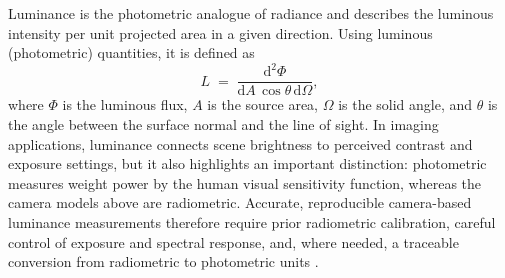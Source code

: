


\noindent
Luminance is the photometric analogue of radiance and describes the luminous intensity per unit projected area in a given direction. Using luminous (photometric) quantities, it is defined as
\begin{equation}
L \;=\; \frac{\mathrm{d}^{2}\Phi}{\mathrm{d}A\,\cos\theta\,\mathrm{d}\Omega},
\end{equation}
where \(\Phi\) is the luminous flux, \(A\) is the source area, \(\Omega\) is the solid angle, and \(\theta\) is the angle between the surface normal and the line of sight. In imaging applications, luminance connects scene brightness to perceived contrast and exposure settings, but it also highlights an important distinction: photometric measures weight power by the human visual sensitivity function, whereas the camera models above are radiometric. Accurate, reproducible camera-based luminance measurements therefore require prior radiometric calibration, careful control of exposure and spectral response, and, where needed, a traceable conversion from radiometric to photometric units \cite{Wuller2007TheMeters}.\\


